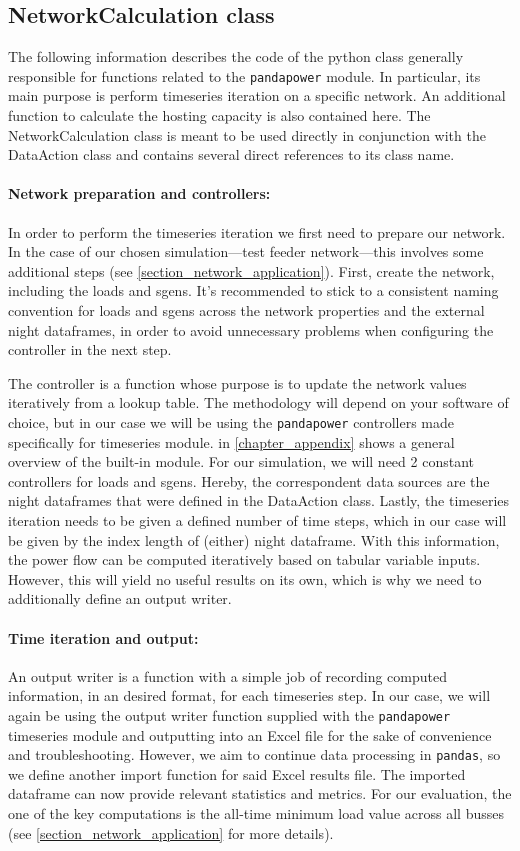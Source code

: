 \documentclass[a4paper,10pt]{report}
\begin{document}
\subsection{NetworkCalculation class}
The following information describes the code of the python class generally responsible for functions related to the \texttt{pandapower} module. In particular, its main purpose is perform timeseries iteration on a specific network. An additional function to calculate the hosting capacity is also contained here. The NetworkCalculation class is meant to be used directly in conjunction with the DataAction class and contains several direct references to its class name.

\paragraph{Network preparation and controllers:} In order to perform the timeseries iteration we first need to prepare our network. In the case of our chosen simulation---test feeder network---this involves some additional steps (see \cref{section_network_application}). First, create the network, including the loads and sgens. It's recommended to stick to a consistent naming convention for loads and sgens across the network properties and the external night dataframes, in order to avoid unnecessary problems when configuring the controller in the next step.

The controller is a function whose purpose is to update the network values iteratively from a lookup table. The methodology will depend on your software of choice, but in our case we will be using the \texttt{pandapower} controllers made specifically for timeseries module.  in \cref{chapter_appendix} shows a general overview of the built-in module.
For our simulation, we will need 2 constant controllers for loads and sgens. Hereby, the correspondent data sources are the night dataframes that were defined in the DataAction class. Lastly, the timeseries iteration needs to be given a defined number of time steps, which in our case will be given by the index length of (either) night dataframe. With this information, the power flow can be computed iteratively based on tabular variable inputs. However, this will yield no useful results on its own, which is why we need to additionally define an output writer.

\paragraph{Time iteration and output:} An output writer is a function with a simple job of recording computed information, in an desired format, for each timeseries step. In our case, we will again be using the output writer function supplied with the \texttt{pandapower} timeseries module and outputting into an Excel file for the sake of convenience and troubleshooting. However, we aim to continue data processing in \texttt{pandas}, so we define another import function for said Excel results file. The imported dataframe can now provide relevant statistics and metrics. For our evaluation, the one of the key computations is the all-time minimum load value across all busses (see \cref{section_network_application} for more details).
\end{document}

